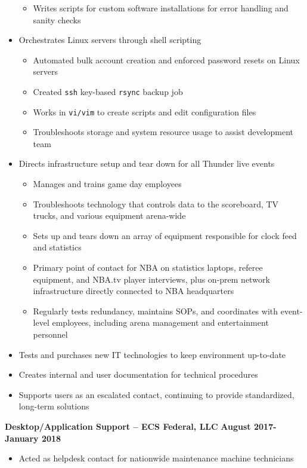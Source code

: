 \documentclass[centered]{res}
\begin{document}
\begin{resume}
\begin{itemize}
\begin{itemize}
	\item Writes scripts for custom software installations for error handling and sanity checks
	\end{itemize}
\item Orchestrates Linux servers through shell scripting
	\begin{itemize}
		\item Automated bulk account creation and enforced password resets on Linux servers
		\item Created \texttt{ssh} key-based \texttt{rsync} backup job
		\item Works in \texttt{vi/vim} to create scripts and edit configuration files
		\item Troubleshoots storage and system resource usage to assist development team
	\end{itemize}
\item Directs infrastructure setup and tear down for all Thunder live events
	\begin{itemize}
	\item Manages and trains game day employees
	\item Troubleshoots technology that controls data to the scoreboard, TV trucks, and various equipment arena-wide
	\item Sets up and tears down an array of equipment responsible for clock feed and statistics
	\item Primary point of contact for NBA on statistics laptops, referee equipment, and NBA.tv player interviews, plus on-prem network infrastructure directly connected to NBA headquarters 
	\item Regularly tests redundancy, maintains SOPs, and coordinates with event-level employees, including arena management and entertainment personnel 
	\end{itemize}
\item Tests and purchases new IT technologies to keep environment up-to-date
\item Creates internal and user documentation for technical procedures 
\item Supports users as an escalated contact, continuing to provide standardized, long-term solutions
\end{itemize}
\textbf{Desktop/Application Support -- ECS Federal, LLC}
\newline
\textbf{August 2017-January 2018}
\begin{itemize}
\item Acted as helpdesk contact for nationwide maintenance machine technicians

\end{itemize}
\end{resume}
\end{document}
